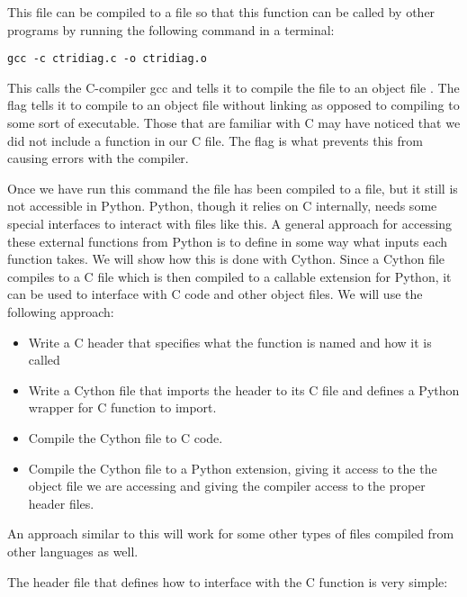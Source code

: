 

This file can be compiled to a  file so that this function can be called by other programs by running the following command in a terminal:
\begin{lstlisting}[style=ShellInput]
gcc -c ctridiag.c -o ctridiag.o
\end{lstlisting}
This calls the C-compiler gcc and tells it to compile the file  to an object file .
The  flag tells it to compile to an object file without linking as opposed to compiling to some sort of executable.
Those that are familiar with C may have noticed that we did not include a  function in our C file.
The  flag is what prevents this from causing errors with the compiler.

Once we have run this command the file has been compiled to a  file, but it still is not accessible in Python.
Python, though it relies on C internally, needs some special interfaces to interact with  files like this.
A general approach for accessing these external functions from Python is to define in some way what inputs each function takes.
We will show how this is done with Cython.
Since a Cython file compiles to a C file which is then compiled to a callable extension for Python, it can be used to interface with C code and other object files.
We will use the following approach:
\begin{itemize}

\item Write a C header that specifies what the function is named and how it is called

\item Write a Cython file that imports the header to its C file and defines a Python wrapper for C function to import.

\item Compile the Cython file to C code.

\item Compile the Cython file to a Python extension, giving it access to the the object file we are accessing and giving the compiler access to the proper header files.

\end{itemize}

An approach similar to this will work for some other types of  files compiled from other languages as well.

The header file that defines how to interface with the C function is very simple:

